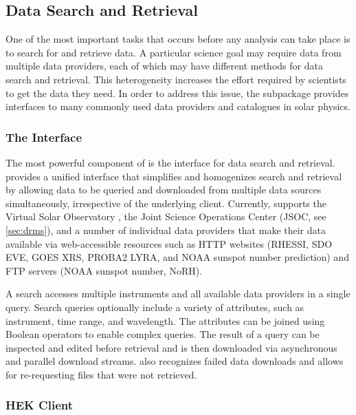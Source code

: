 
\subsection{Data Search and Retrieval}
\label{sec:fido}

One of the most important tasks that occurs before any analysis can take place is to search for and retrieve data.
A particular science goal may require data from multiple data providers, each of which may have different methods for data search and retrieval.
This heterogeneity increases the effort required by scientists to get the data they need.
In order to address this issue, the  subpackage provides interfaces to many commonly used data providers and catalogues in solar physics.

\subsubsection{The \Fido Interface}
\label{sec:fido}

The most powerful component of  is the \Fido interface for data search and retrieval.
\Fido provides a unified interface that simplifies and homogenizes search and retrieval by allowing data to be queried and downloaded from multiple data sources simultaneously, irrespective of the underlying client.
Currently, \Fido supports the Virtual Solar Observatory \citep[VSO,][]{2009EM&P..104..315H}, the Joint Science Operations Center (JSOC, see \autoref{sec:drms}), and a number of individual data providers that make their data available via web-accessible resources such as HTTP websites (RHESSI, SDO EVE, GOES XRS, PROBA2 LYRA, and NOAA sunspot number prediction) and FTP servers (NOAA sunspot number, NoRH).

A \Fido search accesses multiple instruments and all available data providers in a single query.
Search queries optionally include a variety of attributes, such as instrument, time range, and wavelength.
The attributes can be joined using Boolean operators to enable complex queries.
The result of a \Fido query can be inspected and edited before retrieval and is then downloaded via asynchronous and parallel download streams.
\Fido also recognizes failed data downloads and allows for re-requesting files that were not retrieved.

\subsubsection{HEK Client}
\label{sec:hek}

